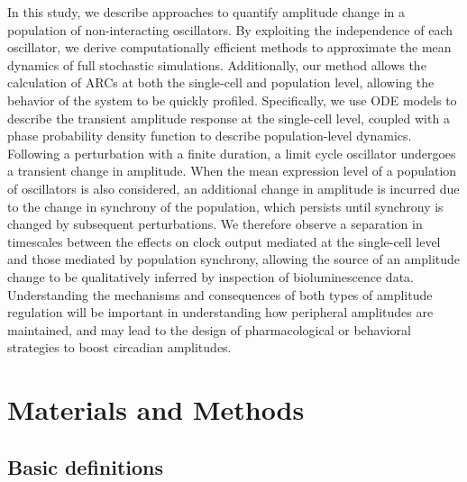 \documentclass[11pt, letterpaper]{article}
\providecommand{\DIFadd}[1]{{\protect\color{blue}#1}} %
\providecommand{\DIFaddbegin}{} %
\providecommand{\DIFaddend}{} %
\begin{document}
\DIFaddend In this study, we \DIFaddbegin \DIFadd{describe approaches }\DIFaddend to quantify amplitude change in a population of \DIFaddbegin \DIFadd{non-interacting oscillators.
By exploiting the independence of each oscillator, we derive computationally efficient methods to approximate the mean dynamics of full stochastic simulations.
Additionally, our method allows the calculation of ARCs at both the single-cell and population level, allowing the behavior of the system to be quickly profiled}\DIFaddend .
Specifically, we use \DIFaddbegin \DIFadd{ODE models to describe the transient amplitude response at the single-cell level}\DIFaddend , coupled with \DIFaddbegin \DIFadd{a }\DIFaddend phase probability density \DIFaddbegin \DIFadd{function to describe population-level dynamics}\DIFaddend .
Following a perturbation with a finite duration, a limit cycle oscillator undergoes a transient change in amplitude.
When the mean expression level of a population of oscillators is also considered, an additional change in amplitude is incurred due to the change in synchrony of the population\DIFaddbegin \DIFadd{, which persists until synchrony }\DIFaddend is changed by subsequent perturbations.
\DIFaddbegin \DIFadd{We therefore observe }\DIFaddend a separation in timescales between the effects on clock output mediated at the \DIFaddbegin \DIFadd{single-cell }\DIFaddend level and those mediated by population synchrony\DIFaddbegin \DIFadd{, allowing }\DIFaddend the source of an amplitude change to be qualitatively inferred \DIFaddbegin \DIFadd{by }\DIFaddend inspection of bioluminescence data.
Understanding the mechanisms and consequences of both types \DIFaddbegin \DIFadd{of amplitude regulation }\DIFaddend will be important in understanding how peripheral \DIFaddbegin \DIFadd{amplitudes are maintained}\DIFaddend , and may lead to the design of pharmacological or behavioral strategies to boost circadian amplitudes.

\section*{Materials and Methods}

\subsection*{Basic definitions}
\DIFaddbegin 
\end{document}
